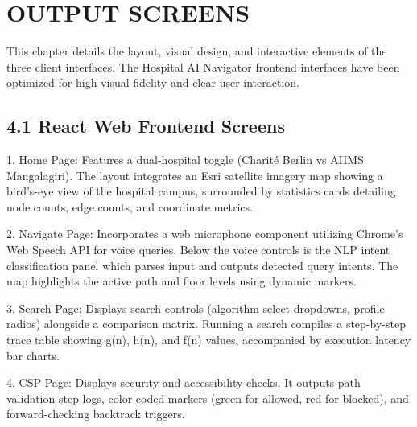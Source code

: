 \documentclass[12pt,a4paper]{report}
\begin{document}
\chapter{OUTPUT SCREENS}

This chapter details the layout, visual design, and interactive elements of the three client interfaces. The Hospital AI Navigator frontend interfaces have been optimized for high visual fidelity and clear user interaction.


\section{4.1 React Web Frontend Screens}

1. Home Page: Features a dual-hospital toggle (Charit\'{e} Berlin vs AIIMS Mangalagiri). The layout integrates an Esri satellite imagery map showing a bird's-eye view of the hospital campus, surrounded by statistics cards detailing node counts, edge counts, and coordinate metrics.

\begin{center}
\end{center}

2. Navigate Page: Incorporates a web microphone component utilizing Chrome's Web Speech API for voice queries. Below the voice controls is the NLP intent classification panel which parses input and outputs detected query intents. The map highlights the active path and floor levels using dynamic markers.

\begin{center}
\end{center}

3. Search Page: Displays search controls (algorithm select dropdowns, profile radios) alongside a comparison matrix. Running a search compiles a step-by-step trace table showing g(n), h(n), and f(n) values, accompanied by execution latency bar charts.

\begin{center}
\end{center}

4. CSP Page: Displays security and accessibility checks. It outputs path validation step logs, color-coded markers (green for allowed, red for blocked), and forward-checking backtrack triggers.
\end{document}
